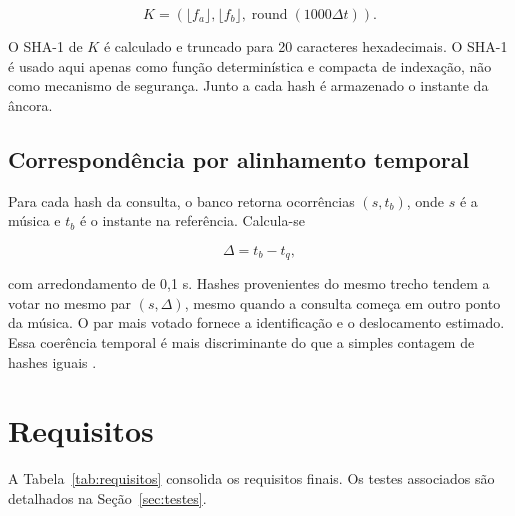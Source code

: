 \documentclass[12pt,a4paper]{article}
\begin{document}
\begin{equation}
    K=(\lfloor f_a\rfloor,\lfloor f_b\rfloor,
    \operatorname{round}(1000\Delta t)).
\end{equation}

O SHA-1 de $K$ é calculado e truncado para 20 caracteres hexadecimais. O SHA-1 é
usado aqui apenas como função determinística e compacta de indexação, não como
mecanismo de segurança. Junto a cada hash é armazenado o instante da âncora.

\subsection{Correspondência por alinhamento temporal}

Para cada hash da consulta, o banco retorna ocorrências $(s,t_b)$, onde $s$ é a
música e $t_b$ é o instante na referência. Calcula-se

\begin{equation}
    \Delta=t_b-t_q,
\end{equation}

com arredondamento de 0,1 s. Hashes provenientes do mesmo trecho tendem a votar
no mesmo par $(s,\Delta)$, mesmo quando a consulta começa em outro ponto da
música. O par mais votado fornece a identificação e o deslocamento estimado.
Essa coerência temporal é mais discriminante do que a simples contagem de hashes
iguais \cite{wang2003}.

\section{Requisitos}

A Tabela~\ref{tab:requisitos} consolida os requisitos finais. Os testes associados
são detalhados na Seção~\ref{sec:testes}.
\end{document}
